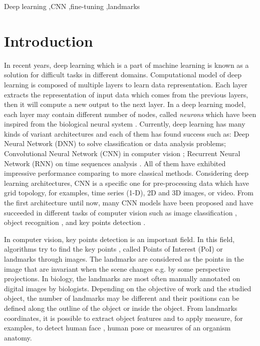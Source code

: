 \documentclass[review]{elsarticle}
\begin{document}
\begin{frontmatter}
\begin{abstract}
\end{abstract}

\begin{keyword}
Deep learning \sep CNN \sep fine-tuning \sep landmarks
\end{keyword}

\end{frontmatter}

\linenumbers

\section{Introduction}
\label{sIntroduction}
In recent years, deep learning which is a part of machine learning is known as a
solution for difficult tasks in different domains\cite{lecun2015deep}. Computational model of deep
learning is composed of multiple layers to learn data
representation. Each layer extracts the representation of input data
which comes from the previous layers, then it will compute a new
output to the next layer. In a deep learning model, each layer may
contain different number of nodes, called \textit{neurons} which have
been inspired from the biological neural system
\cite{arbib2012brains}. Currently, deep learning has many kinds of
variant architectures and each of them has found success such as: Deep
Neural Network (DNN) to solve classification or data analysis
problems\cite{hinton2012deep, mikolov2011strategies}; Convolutional
Neural Network (CNN) in computer vision \cite{lecun1998gradient,
  krizhevsky2012imagenet,szegedy2015going}; Recurrent Neural Network
(RNN) on time sequences analysis \cite{jean2014using,
  sutskever2014sequence,lecun2015deep, collobert2011natural}. All of
them have exhibited impressive performance comparing to more classical
methods. Considering deep learning architectures, CNN is a specific
one for pre-processing data which have grid topology, for
examples, time series (1-D), 2D and 3D images, or video. From the
first architecture \cite{lecun1998gradient} until now, many CNN models
have been proposed and have succeeded in different tasks of computer
vision such as image classification \cite{lecun1998gradient,
  krizhevsky2012imagenet,szegedy2015going}, object recognition
\cite{szegedy2015going,farabet2013learning,li2015convolutional}, and
key points detection \cite{liu2016fashion, sun2013deep,
  zhang2014facial, cintas2016automatic}.


In computer vision, key points detection is an important field. In
this field, algorithms try to find the key points , called Points of
Interest (PoI)  or landmarks through images. The landmarks are
considered as the points in the image that are invariant when the
scene changes e.g. by some perspective projections. In biology, the
landmarks are most often manually annotated on digital images by
biologists. Depending on the objective of work and the studied object,
the number of landmarks may be different and their positions
 can be defined along the outline of the object or inside the
object. From landmarks coordinates, it is possible to extract object
features and to apply measure, for examples, to detect human face
\cite{sun2013deep}, human pose \cite{huang2017coarse} or measures of
an organism anatomy.
\end{document}
